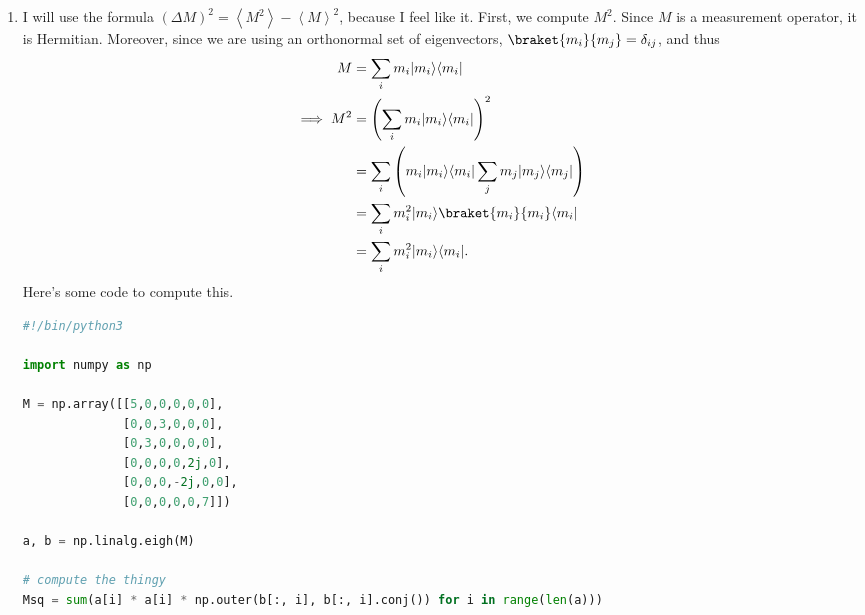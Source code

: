 \documentclass[11pt, letterpaper]{article}
\begin{document}
\begin{enumerate}
		\[
			\mathcal{P}_{m_1} =\left| \braket{m_1}{\psi }  \right| ^2=\left|\frac{1}{\sqrt{6} } \begin{pmatrix}
			0 & 0 & 0 & 0 & 1 & 0
			\end{pmatrix} \begin{pmatrix}
			1 \\
			1 \\
			1 \\
			1 \\
			1 \\
			1
			\end{pmatrix} \right| ^2 = \left| \frac{1}{\sqrt{6} }  \right| ^2=\frac{1}{6} 
		;\]
		\[
			\mathcal{P}_{m_2} =\left| \braket{m_2}{\psi }  \right|^2 = 0;\qquad \mathcal{P}_{m_3} =\left| \braket{m_3}{\psi }  \right| ^2=\frac{1}{3} 
		;\]
		\[
			\mathcal{P}_{m_4} =\left| \braket{m_4}{\psi }  \right| ^2=0 ;\qquad \mathcal{P}_{m_5} =\left| \braket{m_5}{\psi }  \right| ^2=\frac{1}{3};
		\]
		\[
			\mathcal{P}_{m_6} =\left| \braket{m_6}{\psi }  \right|^2=\frac{1}{6} 
		.\]
	\item I will use the formula $(\Delta M)^2=\left\langle M^2 \right\rangle -\left\langle M \right\rangle ^2$, because I feel like it. First, we compute $M^2$. Since $M$ is a measurement operator, it is Hermitian. Moreover, since we are using an orthonormal set of eigenvectors, $\braket{m_i}{m_j} =\delta_{ij} $, and thus
		\begin{align*}
			M&=\sum_{i} m_i \ket{m_i} \bra{m_i}\\
			\implies M^2 &= \left( \sum_{i} m_i \ket{m_i} \bra{m_i}  \right) ^2\\
				     &=\sum_{i}\left( m_i \ket{m_i} \bra{m_i} \sum_{j} m_j\ket{m_j} \bra{m_j}  \right) \\
				     &=\sum_{i} m_i^2 \ket{m_i} \braket{m_i}{m_i} \bra{m_i} \\
				     &=\sum_{i} m_i^2 \ket{m_i} \bra{m_i}
		.\end{align*}
		Here's some code to compute this.
		\begin{lstlisting}[language=Python]			
#!/bin/python3

import numpy as np

M = np.array([[5,0,0,0,0,0],
              [0,0,3,0,0,0],
              [0,3,0,0,0,0],
              [0,0,0,0,2j,0],
              [0,0,0,-2j,0,0],
              [0,0,0,0,0,7]])

a, b = np.linalg.eigh(M)

# compute the thingy
Msq = sum(a[i] * a[i] * np.outer(b[:, i], b[:, i].conj()) for i in range(len(a)))


\end{lstlisting}
\end{enumerate}
\end{document}
